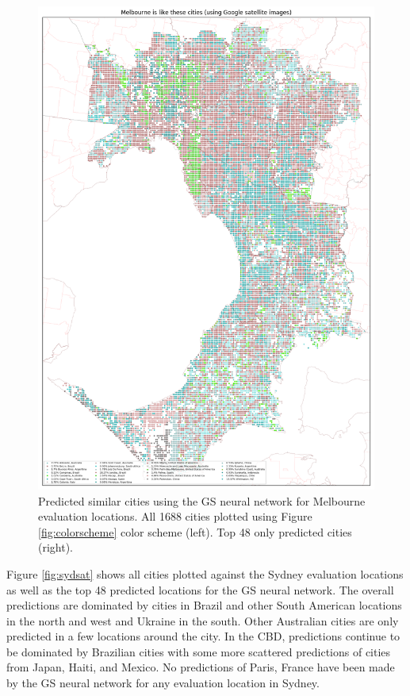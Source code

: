 \documentclass[sageh,times]{sagej}
\begin{document}
\begin{figure}[!htbp]
\includegraphics[scale=0.20]{Images/MelbourneOverallAbrev_sat.png} 
\caption{Predicted similar cities using the GS neural network for Melbourne evaluation locations. All 1688 cities plotted using Figure \ref{fig:colorscheme} color scheme (left). Top 48 only predicted cities (right).}    
 \label{fig:melsat}  
\end{figure} 



Figure \ref{fig:sydsat} shows all cities plotted against the Sydney evaluation locations as well as the top 48 predicted locations for the GS neural network. The overall predictions are dominated by cities in Brazil and other South American locations in the north and west and Ukraine in the south. Other Australian cities are only predicted in a few locations around the city. In the CBD, predictions continue to be dominated by Brazilian cities with some more scattered predictions of cities from Japan, Haiti, and Mexico. No predictions of Paris, France have been made by the GS neural network for any evaluation location in Sydney.
\end{document}
